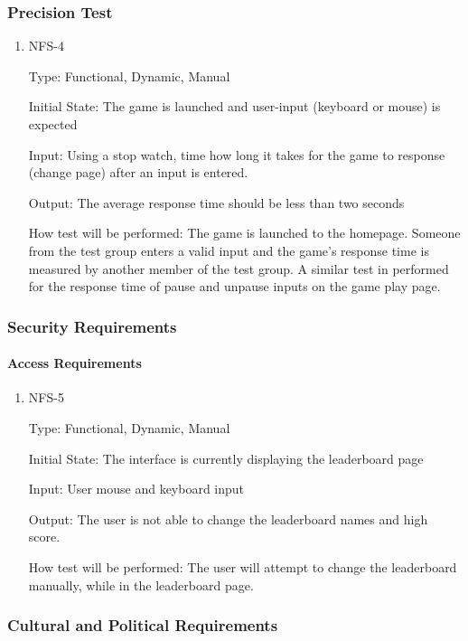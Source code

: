 \documentclass[12pt, titlepage]{article}
\begin{document}
\subsubsection{Precision Test}
\begin{enumerate}
\item{NFS-4\\}

Type: Functional, Dynamic, Manual
					
Initial State: The game is launched and user-input (keyboard or mouse) is expected
					
Input: Using a stop watch, time how long it takes for the game to response (change page) after an input is entered.
					
Output: The average response time should be less than two seconds
					
How test will be performed: The game is launched to the homepage. Someone from the test group enters a valid input and the game's response time is measured by another member of the test group. A similar test in performed for the response time of pause and unpause inputs on the game play page.

\end{enumerate}

\subsubsection{Security Requirements}

\paragraph{Access Requirements}
\begin{enumerate}
\item{NFS-5\\}

Type: Functional, Dynamic, Manual
					
Initial State: The interface is currently displaying the leaderboard page
					
Input: User mouse and keyboard input

Output: The user is not able to change the leaderboard names and high score.
					
How test will be performed: The user will attempt to change the leaderboard manually, while in the leaderboard page.

\end{enumerate}


\subsubsection{Cultural and Political Requirements}
\end{document}
